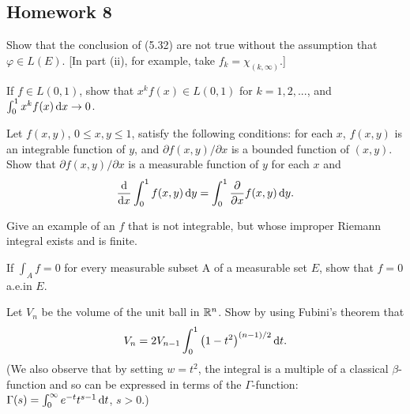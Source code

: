 \subsection{Homework 8}
\begin{problem}
  Show that the conclusion of (5.32) are not true without the assumption
  that $\varphi\in L(E)$. [In part (ii), for example, take
  $f_k=\chi_{(k,\infty)}$.]
\end{problem}
\begin{solution}
\end{solution}

\begin{problem}
  If $f\in L(0,1)$, show that $x^kf(x)\in L(0,1)$ for $k=1,2,...$, and
  $\int_0^1 x^kf(x)\mathop{}\!\mathrm{d} x\to 0$.
\end{problem}
\begin{solution}
\end{solution}

\begin{problem}
  Let $f(x,y)$, $0\leq x,y\leq 1$, satisfy the following conditions: for
  each $x$, $f(x,y)$ is an integrable function of $y$, and
  $\partial f(x,y)/\partial x$ is a bounded function of $(x,y)$. Show that
  $\partial f(x,y)/\partial x$ is a measurable function of $y$ for each $x$
  and
  \[
    \frac{\mathrm{d}}{\mathrm{d} x}\int_0^1f(x,y)\mathop{}\!\mathrm{d}
    y=\int_0^1\frac{\partial}{\partial x}f(x,y)\mathop{}\!\mathrm{d} y.
  \]
\end{problem}
\begin{solution}
\end{solution}

\begin{problem}
  Give an example of an $f$ that is not integrable, but whose improper
  Riemann integral exists and is finite.
\end{problem}
\begin{solution}
\end{solution}

\begin{problem}
  If $\int_A f=0$ for every measurable subset A of a measurable set $E$,
  show that $f=0$ a.e.\@ in $E$.
\end{problem}
\begin{solution}
\end{solution}

\begin{problem}
  Let $V_n$ be the volume of the unit ball in $\mathbb{R}^n$. Show by using
  Fubini's theorem that
  \[
    V_n=2V_{n-1}\int_0^1\left(1-t^2\right)^{(n-1)/2}\mathop{}\!\mathrm{d} t.
  \]
  (We also observe that by setting $w=t^2$, the integral is a multiple of a
  classical $\beta$-function and so can be expressed in terms of the
  $\Gamma$-function: $\Gamma(s)=\int_0^\infty e^{-t}t^{s-1}\mathop{}\!\mathrm{d} t$,
  $s>0$.)
\end{problem}
\begin{solution}
\end{solution}

